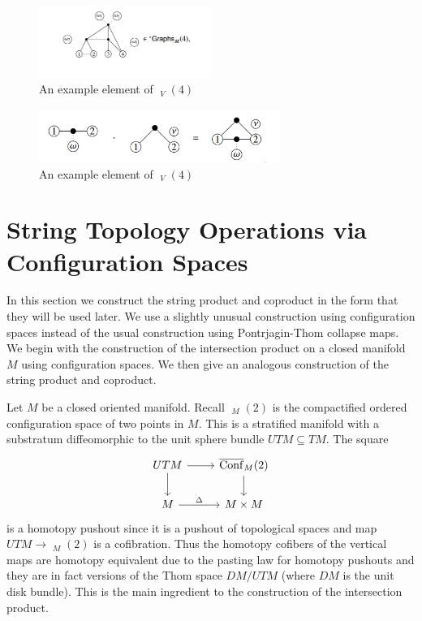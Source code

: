 \documentclass{scrartcl}
\theoremstyle{plain}
\theoremstyle{definition}
\renewcommand{\subset}{\subseteq}
\DeclareMathOperator{\cConf}{\overline{Conf}}
\DeclareMathOperator{\coGraphs}{{}^*Graphs}
\begin{document}
\begin{figure}[ht]
    \centering
    \includegraphics[width=0.5\textwidth]{img/cw-graphs-ast-example.png}
    \caption{An example element of $\coGraphs_V(4)$}\label{cw-graphs-ast-example.png}
\end{figure}    
\begin{figure}[ht]
    \centering
    \includegraphics[width=0.7\textwidth]{img/cw-graphs-mult.png}
    \caption{An example element of $\coGraphs_V(4)$}\label{cw-graphs-mult}
\end{figure}















\section{String Topology Operations via Configuration Spaces}

In this section we construct the string product and coproduct in the form that they will be used later. We use a slightly unusual construction using configuration spaces instead of the usual construction using Pontrjagin-Thom collapse maps. We begin with the construction of the intersection product on a closed manifold $M$ using configuration spaces. We then give an analogous construction of the string product and coproduct. 

Let $M$ be a closed oriented manifold. Recall $\cConf_M(2)$ is the compactified ordered configuration space of two points in $M$. This is a stratified manifold with a substratum diffeomorphic to the unit sphere bundle $UTM\subset TM$. The square
\begin{equation}\label{M_pushout}
\begin{tikzcd}
    UTM \dar\rar & \cConf_M(2)\dar \\
    M \rar["\Delta"] & M\times M
\end{tikzcd}
\end{equation}
is a homotopy pushout since it is a pushout of topological spaces and map $UTM \to \cConf_M(2)$ is a cofibration. Thus the homotopy cofibers of the  vertical maps are homotopy equivalent due to the pasting law for homotopy pushouts %
and they are in fact versions of the Thom space $DM / UTM$ (where $DM$ is the unit disk bundle). This is the main ingredient to the construction of the intersection product. 
\end{document}
